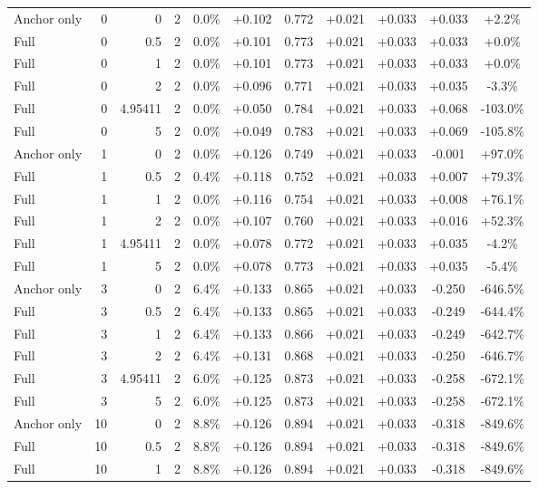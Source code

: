 \begin{table}[htbp]
\begin{tabular}{lrrrccccccc}
Anchor only & 0 & 0 & 2 & 0.0\% & +0.102 & 0.772 & +0.021 & +0.033 & +0.033 & +2.2\% \\
Full & 0 & 0.5 & 2 & 0.0\% & +0.101 & 0.773 & +0.021 & +0.033 & +0.033 & +0.0\% \\
Full & 0 & 1 & 2 & 0.0\% & +0.101 & 0.773 & +0.021 & +0.033 & +0.033 & +0.0\% \\
Full & 0 & 2 & 2 & 0.0\% & +0.096 & 0.771 & +0.021 & +0.033 & +0.035 & -3.3\% \\
Full & 0 & 4.95411 & 2 & 0.0\% & +0.050 & 0.784 & +0.021 & +0.033 & +0.068 & -103.0\% \\
Full & 0 & 5 & 2 & 0.0\% & +0.049 & 0.783 & +0.021 & +0.033 & +0.069 & -105.8\% \\
Anchor only & 1 & 0 & 2 & 0.0\% & +0.126 & 0.749 & +0.021 & +0.033 & -0.001 & +97.0\% \\
Full & 1 & 0.5 & 2 & 0.4\% & +0.118 & 0.752 & +0.021 & +0.033 & +0.007 & +79.3\% \\
Full & 1 & 1 & 2 & 0.0\% & +0.116 & 0.754 & +0.021 & +0.033 & +0.008 & +76.1\% \\
Full & 1 & 2 & 2 & 0.0\% & +0.107 & 0.760 & +0.021 & +0.033 & +0.016 & +52.3\% \\
Full & 1 & 4.95411 & 2 & 0.0\% & +0.078 & 0.772 & +0.021 & +0.033 & +0.035 & -4.2\% \\
Full & 1 & 5 & 2 & 0.0\% & +0.078 & 0.773 & +0.021 & +0.033 & +0.035 & -5.4\% \\
Anchor only & 3 & 0 & 2 & 6.4\% & +0.133 & 0.865 & +0.021 & +0.033 & -0.250 & -646.5\% \\
Full & 3 & 0.5 & 2 & 6.4\% & +0.133 & 0.865 & +0.021 & +0.033 & -0.249 & -644.4\% \\
Full & 3 & 1 & 2 & 6.4\% & +0.133 & 0.866 & +0.021 & +0.033 & -0.249 & -642.7\% \\
Full & 3 & 2 & 2 & 6.4\% & +0.131 & 0.868 & +0.021 & +0.033 & -0.250 & -646.7\% \\
Full & 3 & 4.95411 & 2 & 6.0\% & +0.125 & 0.873 & +0.021 & +0.033 & -0.258 & -672.1\% \\
Full & 3 & 5 & 2 & 6.0\% & +0.125 & 0.873 & +0.021 & +0.033 & -0.258 & -672.1\% \\
Anchor only & 10 & 0 & 2 & 8.8\% & +0.126 & 0.894 & +0.021 & +0.033 & -0.318 & -849.6\% \\
Full & 10 & 0.5 & 2 & 8.8\% & +0.126 & 0.894 & +0.021 & +0.033 & -0.318 & -849.6\% \\
Full & 10 & 1 & 2 & 8.8\% & +0.126 & 0.894 & +0.021 & +0.033 & -0.318 & -849.6\% \\

\end{tabular}
\end{table}
